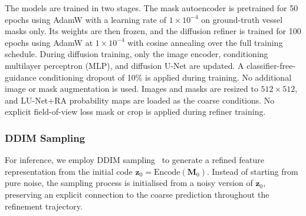 \documentclass[jimaging,article,submit,pdftex,moreauthors]
  {Definitions/mdpi}
\begin{document}
The models are trained in two stages. The mask autoencoder is pretrained for 50 epochs using AdamW with a learning rate of $1\times10^{-4}$ on ground-truth vessel masks only. Its weights are then frozen, and the diffusion refiner is trained for 100 epochs using AdamW at $1\times10^{-4}$ with cosine annealing over the full training schedule. During diffusion training, only the image encoder, conditioning multilayer perceptron (MLP), and diffusion U-Net are updated. A classifier-free-guidance conditioning dropout of 10\% is applied during training. No additional image or mask augmentation is used. Images and masks are resized to $512\times512$, and LU-Net+RA probability maps are loaded as the coarse conditions. No explicit field-of-view loss mask or crop is applied during refiner training.

\subsubsection{DDIM Sampling}

For inference, we employ DDIM sampling~\cite{Song2021} to generate a refined feature representation from the initial code $\mathbf{z}_0=\mathrm{Encode}(\mathbf{M}_0)$. Instead of starting from pure noise, the sampling process is initialised from a noisy version of $\mathbf{z}_0$, preserving an explicit connection to the coarse prediction throughout the refinement trajectory.
\end{document}
